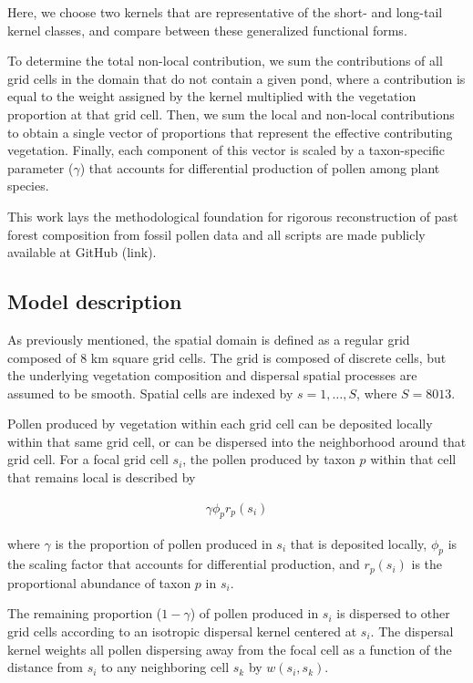 \documentclass[12pt]{article}
\begin{document}
Here, we choose two kernels that are representative of the short- and
long-tail kernel classes, and compare between these generalized
functional forms.


To determine the total non-local contribution, we sum the
contributions of all grid cells in the domain that do not contain a
given pond, where a contribution is equal to the weight assigned by
the kernel multiplied with the vegetation proportion at that grid
cell. Then, we sum the local and non-local contributions to obtain a
single vector of proportions that represent the effective contributing
vegetation. Finally, each component of this vector is scaled by a
taxon-specific parameter ($\gamma$) that accounts for differential
production of pollen among plant species.

This work lays the methodological foundation for rigorous
reconstruction of past forest composition from fossil pollen data and
all scripts are made publicly available at GitHub (link).

\subsection{Model description}

As previously mentioned, the spatial domain is defined as a regular
grid composed of 8 km square grid cells. The grid is composed of
discrete cells, but the underlying vegetation composition and
dispersal spatial processes are assumed to be smooth. Spatial cells
are indexed by $s=1,\ldots,S$, where $S=8013$.

Pollen produced by vegetation within each grid cell can be deposited
locally within that same grid cell, or can be dispersed into the
neighborhood around that grid cell. For a focal grid cell
$s_i$, the pollen produced by taxon $p$ within that cell that remains
local is described by

\begin{align}
\gamma \phi_p r_p(s_i)
\end{align} 

where $\gamma$ is the proportion of pollen produced in $s_i$ that is deposited locally,
$\phi_p$ is the scaling factor that accounts for differential
production, and $r_p(s_i)$ is the proportional abundance of taxon $p$
in $s_i$.

The remaining proportion ($1-\gamma$) of pollen produced in $s_i$ is
dispersed to other grid cells according to an isotropic dispersal
kernel centered at $s_i$. The dispersal kernel weights all pollen
dispersing away from the focal cell as a function of the distance from
$s_i$ to any neighboring cell $s_k$ by $w(s_i, s_k)$. 
\end{document}
